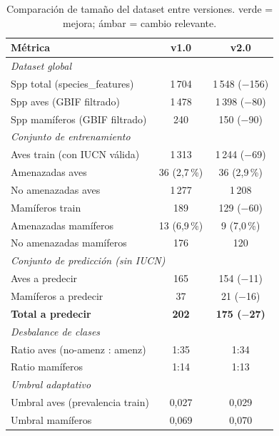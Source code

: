 \documentclass[12pt,a4paper]{article}
\newcommand{\celplus}[1]{\cellcolor{verdeClaro}#1}   %
\newcommand{\celneutro}[1]{\cellcolor{ambarClaro}#1} %
\begin{document}
\begin{table}[H]
  \centering
  \caption{Comparación de tamaño del dataset entre versiones.
           \colorbox{verdeClaro}{\footnotesize verde} = mejora;
           \colorbox{ambarClaro}{\footnotesize ámbar} = cambio relevante.}
  \label{tab:dataset_comp}
  \setlength{\tabcolsep}{8pt}
  \begin{tabular}{lcc}
    \toprule
    \textbf{Métrica} & \textbf{v1.0} & \textbf{v2.0} \\
    \midrule
    \multicolumn{3}{l}{\textit{Dataset global}} \\
    \quad Spp total (species\_features) & 1\,704 & \celneutro{1\,548 ($-$156)} \\
    \quad Spp aves (GBIF filtrado) & 1\,478 & \celneutro{1\,398 ($-$80)} \\
    \quad Spp mamíferos (GBIF filtrado) & 240 & \celneutro{150 ($-$90)} \\
    \midrule
    \multicolumn{3}{l}{\textit{Conjunto de entrenamiento}} \\
    \quad Aves train (con IUCN válida) & 1\,313 & 1\,244 ($-$69) \\
    \quad \quad Amenazadas aves & 36 (2,7\,\%) & 36 (2,9\,\%) \\
    \quad \quad No amenazadas aves & 1\,277 & 1\,208 \\
    \quad Mamíferos train & 189 & 129 ($-$60) \\
    \quad \quad Amenazadas mamíferos & 13 (6,9\,\%) & \celneutro{9 (7,0\,\%)} \\
    \quad \quad No amenazadas mamíferos & 176 & 120 \\
    \midrule
    \multicolumn{3}{l}{\textit{Conjunto de predicción (sin IUCN)}} \\
    \quad Aves a predecir & 165 & 154 ($-$11) \\
    \quad Mamíferos a predecir & 37 & 21 ($-$16) \\
    \quad \textbf{Total a predecir} & \textbf{202} & \celplus{\textbf{175 ($-$27)}} \\
    \midrule
    \multicolumn{3}{l}{\textit{Desbalance de clases}} \\
    \quad Ratio aves (no-amenz : amenz) & 1:35 & 1:34 \\
    \quad Ratio mamíferos & 1:14 & 1:13 \\
    \midrule
    \multicolumn{3}{l}{\textit{Umbral adaptativo}} \\
    \quad Umbral aves (prevalencia train) & 0,027 & 0,029 \\
    \quad Umbral mamíferos & 0,069 & 0,070 \\
    \bottomrule
  \end{tabular}
\end{table}
\end{document}
